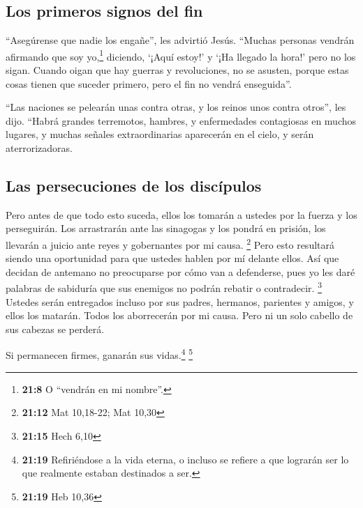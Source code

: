 \hypertarget{los-primeros-signos-del-fin}{%
\subsection{Los primeros signos del
fin}\label{los-primeros-signos-del-fin}}

 ``Asegúrense que nadie los engañe'', les advirtió Jesús.
``Muchas personas vendrán afirmando que soy yo,\footnote{\textbf{21:8} O
  ``vendrán en mi nombre''.} diciendo, `¡Aquí estoy!' y `¡Ha llegado la
hora!' pero no los sigan.  Cuando oigan que hay guerras y
revoluciones, no se asusten, porque estas cosas tienen que suceder
primero, pero el fin no vendrá enseguida''.

 ``Las naciones se pelearán unas contra otras, y los
reinos unos contra otros'', les dijo.  ``Habrá grandes
terremotos, hambres, y enfermedades contagiosas en muchos lugares, y
muchas señales extraordinarias aparecerán en el cielo, y serán
aterrorizadoras.

\hypertarget{las-persecuciones-de-los-discuxedpulos}{%
\subsection{Las persecuciones de los
discípulos}\label{las-persecuciones-de-los-discuxedpulos}}

 Pero antes de que todo esto suceda, ellos los tomarán a
ustedes por la fuerza y los perseguirán. Los arrastrarán ante las
sinagogas y los pondrá en prisión, los llevarán a juicio ante reyes y
gobernantes por mi causa. \footnote{\textbf{21:12} Mat 10,18-22; Mat
  10,30}  Pero esto resultará siendo una oportunidad para
que ustedes hablen por mí delante ellos.  Así que decidan
de antemano no preocuparse por cómo van a defenderse, 
pues yo les daré palabras de sabiduría que sus enemigos no podrán
rebatir o contradecir. \footnote{\textbf{21:15} Hech 6,10}
 Ustedes serán entregados incluso por sus padres,
hermanos, parientes y amigos, y ellos los matarán.  Todos
los aborrecerán por mi causa.  Pero ni un solo cabello de
sus cabezas se perderá.

 Si permanecen firmes, ganarán sus vidas.\footnote{\textbf{21:19}
  Refiriéndose a la vida eterna, o incluso se refiere a que lograrán ser
  lo que realmente estaban destinados a ser.} \footnote{\textbf{21:19}
  Heb 10,36}

